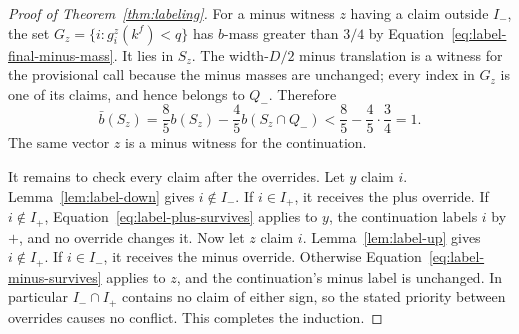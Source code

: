 \begin{proof}[Proof of Theorem~\ref{thm:labeling}]
For a minus witness $z$ having a claim outside $I_-$, the set
$G_z=\{i:g_i^z(k^f)<q\}$ has $b$-mass greater than $3/4$ by
Equation~\eqref{eq:label-final-minus-mass}.  It lies in $S_z$.
The width-$D/2$ minus translation is a witness for the provisional
call because the minus masses are unchanged; every index in $G_z$
is one of its claims, and hence belongs to $Q_-$.  Therefore
\begin{equation}
 \bar b(S_z)
   =\frac85 b(S_z)-\frac45 b(S_z\cap Q_-)
   <\frac85-\frac45\cdot\frac34=1.
 \label{eq:label-minus-survives}
\end{equation}
The same vector $z$ is a minus witness for the continuation.

It remains to check every claim after the overrides.  Let $y$
claim $i$.  Lemma~\ref{lem:label-down} gives $i\notin I_-$.
If $i\in I_+$, it receives the plus override.  If $i\notin I_+$,
Equation~\eqref{eq:label-plus-survives} applies to $y$, the
continuation labels $i$ by $+$, and no override changes it.
Now let $z$ claim $i$.  Lemma~\ref{lem:label-up} gives
$i\notin I_+$.  If $i\in I_-$, it receives the minus override.
Otherwise Equation~\eqref{eq:label-minus-survives} applies to $z$,
and the continuation's minus label is unchanged.  In particular
$I_-\cap I_+$ contains no claim of either sign, so the stated
priority between overrides causes no conflict.  This completes
the induction.
\end{proof}
